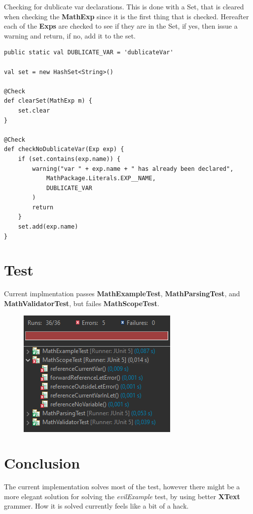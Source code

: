 \documentclass{article}
\begin{document}
Checking for dublicate var declarations. This is done with a Set, that is cleared when checking the \textbf{MathExp} since it is the first thing that is checked. Hereafter each of the \textbf{Exps} are checked to see if they are in the Set, if yes, then issue a warning and return, if no, add it to the set.

\begin{lstlisting}[language={xtend}, caption={XTend validator}, captionpos={b}]
public static val DUBLICATE_VAR = 'dublicateVar'

val set = new HashSet<String>()

@Check
def clearSet(MathExp m) {
    set.clear
}

@Check
def checkNoDublicateVar(Exp exp) {
    if (set.contains(exp.name)) {
        warning("var " + exp.name + " has already been declared",
            MathPackage.Literals.EXP__NAME,
            DUBLICATE_VAR
        )
        return
    }
    set.add(exp.name)
}
\end{lstlisting}
\section{Test}

Current implmentation passes \textbf{MathExampleTest}, \textbf{MathParsingTest}, and \textbf{MathValidatorTest}, but failes \textbf{MathScopeTest}.

\begin{figure}[H]
    \centering
    \includegraphics{tests.PNG}
\end{figure}

\section{Conclusion}

The current implementation solves most of the test, however there might be a more elegant solution for solving the \textit{evilExample} test, by using better \textbf{XText} grammer. How it is solved currently feels like a bit of a hack.
\end{document}
